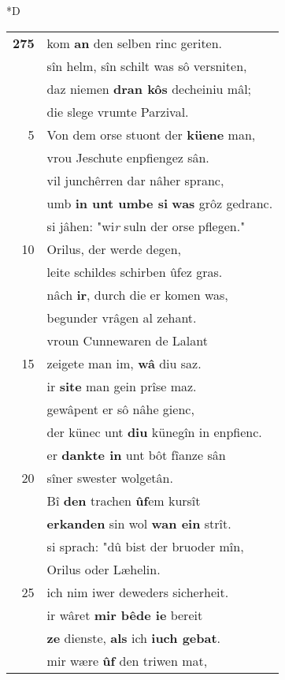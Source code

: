 \documentclass[8pt,a4paper,notitlepage]{article}
\begin{document}
\begin{table}[ht]
\begin{minipage}[t]{0.5\linewidth}
\small
\begin{center}*D
\end{center}
\begin{tabular}{rl}
\textbf{275} & kom \textbf{an} den selben rinc geriten.\\ 
 & sîn helm, sîn schilt was sô versniten,\\ 
 & daz niemen \textbf{dran kôs} decheiniu mâl;\\ 
 & die slege vrumte Parzival.\\ 
5 & Von dem orse stuont der \textbf{küene} man,\\ 
 & vrou Jeschute enpfiengez sân.\\ 
 & vil junchêrren dar nâher spranc,\\ 
 & umb \textbf{in unt umbe si} \textbf{was} grôz gedranc.\\ 
 & si jâhen: "wi\textit{r} suln der orse pflegen."\\ 
10 & Orilus, der werde degen,\\ 
 & leite schildes schirben ûfez gras.\\ 
 & nâch \textbf{ir}, durch die er komen was,\\ 
 & begunder vrâgen al zehant.\\ 
 & vroun Cunnewaren de Lalant\\ 
15 & zeigete man im, \textbf{wâ} diu saz.\\ 
 & ir \textbf{site} man gein prîse maz.\\ 
 & gewâpent er sô nâhe gienc,\\ 
 & der künec unt \textbf{diu} künegîn in enpfienc.\\ 
 & er \textbf{dankte in} unt bôt fîanze sân\\ 
20 & sîner swester wolgetân.\\ 
 & Bî \textbf{den} trachen \textbf{ûf}em kursît\\ 
 & \textbf{erkanden} sin wol \textbf{wan ein} strît.\\ 
 & si sprach: "dû bist der bruoder mîn,\\ 
 & Orilus oder Læhelin.\\ 
25 & ich nim iwer deweders sicherheit.\\ 
 & ir wâret \textbf{mir bêde ie} bereit\\ 
 & \textbf{ze} dienste, \textbf{als} ich \textbf{iuch gebat}.\\ 
 & mir wære \textbf{ûf} den triwen mat,\\ 

\end{tabular}
\end{minipage}
\end{table}
\end{document}
